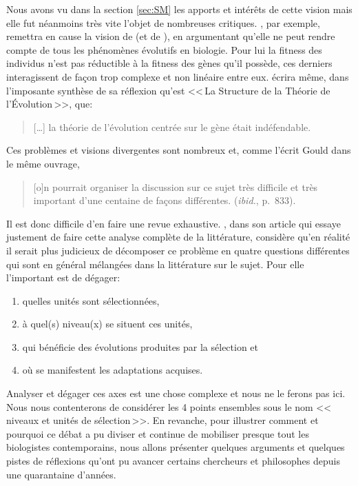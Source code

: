 Nous avons vu dans la section \ref{sec:SM} les apports et intérêts de cette vision mais elle fut néanmoins très vite l'objet de nombreuses critiques. \cite{wimsatt1980theunitsofselectionandthestructureofthemultilevelgenome}, par exemple, remettra en cause la vision de \cite{williams1966adaptationandnaturalselection} (et de \cite{dawkins76selfishgene}), en argumentant qu'elle ne peut rendre compte de tous les phénomènes évolutifs en biologie. Pour lui la fitness des individus n'est pas réductible à la fitness des gènes qu'il possède, ces derniers interagissent de façon trop complexe et non linéaire entre eux. \cite{gould2002thestructureofevolutionarytheory} écrira même, dans l'imposante synthèse de sa réflexion qu'est <<\,La Structure de la Théorie de l'\'Evolution\,>>, que:
\begin{quote}
	[\ldots] la théorie de l'évolution centrée sur le gène était indéfendable.\\ \citep[p.~855]{gould2002thestructureofevolutionarytheory}
\end{quote}
Ces problèmes et visions divergentes sont nombreux et, comme l'écrit Gould dans le même ouvrage,
\begin{quote}
	[o]n pourrait organiser la discussion sur ce sujet très difficile et très important d'une centaine de façons différentes. (\emph{ibid.}, p.~833).
\end{quote}
Il est donc difficile d'en faire une revue exhaustive. \cite{lloyd12unitsandlevelsofselection}, dans son article qui essaye justement de faire cette analyse complète de la littérature, considère qu'en réalité il serait plus judicieux de décomposer ce problème en quatre questions différentes qui sont en général mélangées dans la littérature sur le sujet. Pour elle l'important est de dégager: 
\begin{enumerate}
	\item quelles unités sont sélectionnées,
	\item à quel(s) niveau(x) se situent ces unités,
	\item qui bénéficie des évolutions produites par la sélection et
	\item où se manifestent les adaptations acquises.
\end{enumerate}

Analyser et dégager ces axes est une chose complexe et nous ne le ferons pas ici. Nous nous contenterons de considérer les 4 points ensembles sous le nom <<\,niveaux et unités de sélection\,>>. En revanche, pour illustrer comment et pourquoi ce débat a pu diviser et continue de mobiliser presque tout les biologistes contemporains, nous allons présenter quelques arguments et quelques pistes de réflexions qu'ont pu avancer certains chercheurs et philosophes depuis une quarantaine d'années.

